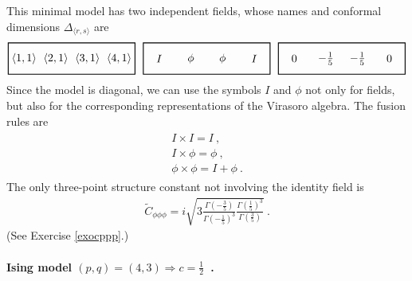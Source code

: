 \documentclass[12pt, a4paper, notitlepage, twoside]{report}
\numberwithin{equation}{section}
\theoremstyle{break}
\begin{document}
This minimal model has two independent fields, whose names and conformal dimensions $\Delta_{\langle r,s\rangle}$ are 
\begin{align}
 \begin{tikzpicture}[scale = .5, baseline=(current  bounding  box.center)]
  \draw[thick] (-1,-1) -- (-1, 1) -- (7, 1) -- (7, -1) -- cycle;
  \foreach \x in {1, ..., 4}{
  \node at ({2*(\x-1)}, 0) {$\langle \x,1\rangle $};
  }
 \end{tikzpicture}
 \ \ 
 \begin{tikzpicture}[scale = .5, baseline=(current  bounding  box.center)]
  \draw[thick] (-1,-1) -- (-1, 1) -- (7, 1) -- (7, -1) -- cycle;
  \node at (0, 0) {$I$};
  \node at (2, 0) {$\phi$};
  \node at (4, 0) {$\phi$};
  \node at (6, 0) {$I$};
  \end{tikzpicture}
  \ \ 
  \begin{tikzpicture}[scale = .5, baseline=(current  bounding  box.center)]
  \draw[thick] (-1,-1) -- (-1, 1) -- (7, 1) -- (7, -1) -- cycle;
  \node at (0, 0) {$0$};
  \node at (2, 0) {$-\frac15$};
  \node at (4, 0) {$-\frac15$};
  \node at (6, 0) {$0$};
  \end{tikzpicture}
\end{align}
Since the model is diagonal, we can use the symbols $I$ and $\phi$ not only for fields, but also for the corresponding representations of the Virasoro algebra.
The fusion rules are 
\begin{align}
 \begin{array}{l}
  I\times I = I \ ,
\\ I\times \phi= \phi\ ,
\\ \phi \times \phi = I + \phi\ .
 \end{array}
\end{align}
The only three-point structure constant not involving the identity field is 
\begin{align}
 \tilde{C}_{\phi\phi\phi} = i\sqrt{3\frac{\Gamma(-\frac35)}{\Gamma(-\frac15)^3} \frac{\Gamma(\frac15)^3}{\Gamma(\frac35)}}\ .
\label{cppp}
\end{align}
(See Exercise \ref{exocppp}.)

\paragraph{\textbf{\boldmath Ising model} $(p,q)=(4,3) \Rightarrow c=\tfrac12$\ .}
\end{document}

